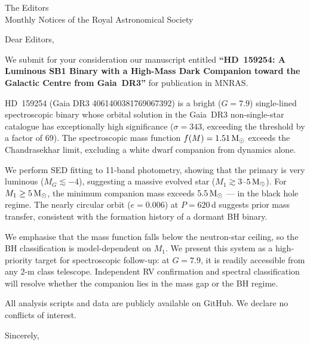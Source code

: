 \documentclass[12pt]{letter}
\date{\today}
\begin{document}
\begin{letter}{The Editors\\Monthly Notices of the Royal Astronomical Society}

\opening{Dear Editors,}

We submit for your consideration our manuscript entitled
\textbf{``HD~159254: A Luminous SB1 Binary with a High-Mass
Dark Companion toward the Galactic Centre from Gaia~DR3''}
for publication in MNRAS.

HD~159254 (Gaia DR3 4061400381769067392) is a bright ($G=7.9$)
single-lined spectroscopic binary whose orbital solution in the
Gaia~DR3 non-single-star catalogue has exceptionally high
significance ($\sigma = 343$, exceeding the threshold by a
factor of 69).  The spectroscopic mass function
$f(M) = 1.51\,{\rm M}_\odot$ exceeds the Chandrasekhar limit,
excluding a white dwarf companion from dynamics alone.

We perform SED fitting to 11-band photometry, showing that the
primary is very luminous ($M_G \lesssim -4$), suggesting a
massive evolved star ($M_1 \gtrsim 3$--$5\,{\rm M}_\odot$).
For $M_1 \ge 5\,{\rm M}_\odot$, the minimum companion mass
exceeds $5.5\,{\rm M}_\odot$ --- in the black hole regime.  The
nearly circular orbit ($e = 0.006$) at $P = 620$\,d suggests
prior mass transfer, consistent with the formation history of a
dormant BH binary.

We emphasise that the mass function falls below the neutron-star
ceiling, so the BH classification is model-dependent on $M_1$.
We present this system as a high-priority target for spectroscopic
follow-up: at $G = 7.9$, it is readily accessible from any 2-m
class telescope.  Independent RV confirmation and spectral
classification will resolve whether the companion lies in the mass
gap or the BH regime.

All analysis scripts and data are publicly available on GitHub.
We declare no conflicts of interest.

\closing{Sincerely,}

\end{letter}
\end{document}

